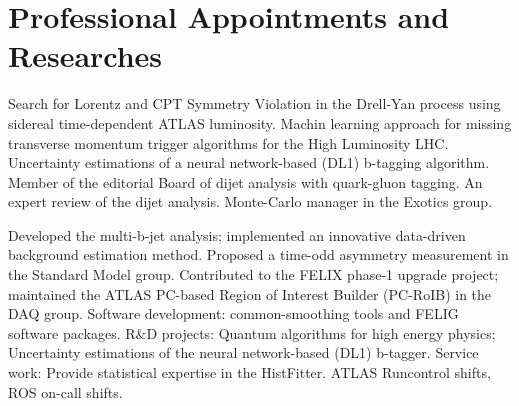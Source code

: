 \section{Professional Appointments and Researches}

\begin{cventries}
\end{cventries}
      \vspace{-1cm}
      \parbox{0.8\linewidth}{
      \leftskip=0.5in
       Search for Lorentz and  CPT Symmetry Violation in the Drell-Yan process using 
       sidereal time-dependent ATLAS luminosity. Machin learning approach for missing 
       transverse momentum trigger algorithms for the High Luminosity LHC. 
        Uncertainty estimations of a neural network-based (DL1) b-tagging algorithm.\newline
        Member of the editorial Board of dijet analysis with quark-gluon tagging. 
        An expert review of the dijet analysis. \newline
        Monte-Carlo manager in the Exotics group.
        }
 
 \begin{cventries}   
  \end{cventries}
  \vspace{-1cm}
   \parbox{0.8\linewidth}{
      \leftskip=0.5in
       Developed the multi-b-jet analysis; implemented an innovative data-driven background
       estimation method. Proposed a time-odd asymmetry measurement in the Standard Model group. \newline
        Contributed to the FELIX phase-1 upgrade project; maintained the ATLAS PC-based Region of 
        Interest Builder (PC-RoIB) in the DAQ group. \newline
        Software development: common-smoothing tools and FELIG software packages. \newline
        R$\&$D projects: Quantum algorithms for high energy physics; Uncertainty estimations 
        of the neural network-based (DL1) b-tagger. \newline
        Service work: Provide statistical expertise in the HistFitter. ATLAS Runcontrol shifts,
        ROS on-call shifts.
    }
    

